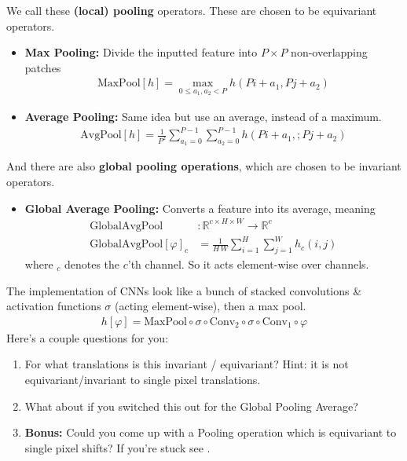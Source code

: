 We call these \textbf{(local) pooling} operators. These are chosen to be equivariant operators.
\begin{itemize}
	\item \textbf{Max Pooling:} Divide the inputted feature into $P \times P$ non-overlapping patches
	\begin{align}
		\text{MaxPool}[h] = \max_{0 \le a_1, a_2 < P} h(Pi + a_1 , Pj + a_2)
	\end{align}
	\item \textbf{Average Pooling:} Same idea but use an average, instead of a maximum.
	\begin{align}
		\text{AvgPool}[h] = \frac{1}{P^2} \sum_{a_1=0}^{P-1} \sum_{a_2=0}^{P-1} h(Pi + a_1, ; Pj + a_2)
	\end{align}
\end{itemize}
And there are also \textbf{global pooling operations}, which are chosen to be invariant operators.
\begin{itemize}
	\item \textbf{Global Average Pooling:} Converts a feature into its average, meaning
	\begin{align}
	\text{GlobalAvgPool} & : \mathbb R^{c \times H \times W} \to \mathbb R^{c}\\
		\text{GlobalAvgPool}[\varphi]_c & = \frac{1}{H \, W}\sum_{i=1}^H \sum_{j=1}^W h_c(i,j)
	\end{align}
	where $_c$ denotes the $c$'th channel. So it acts element-wise over channels.
\end{itemize}
\begin{problem}
	The implementation of CNNs look like a bunch of stacked convolutions \& activation functions $\sigma$ (acting element-wise), then a max pool.
	\begin{align}
		h[\varphi] = \text{MaxPool} \circ \sigma \circ \text{Conv}_2 \circ \sigma \circ \text{Conv}_1 \circ \varphi
	\end{align}
	Here's a couple questions for you:
	\begin{enumerate}
		\item For what translations is this invariant / equivariant? Hint: it is not equivariant/invariant to single pixel translations.
		\item What about if you switched this out for the Global Pooling Average?
		\item \textbf{Bonus:} Could you come up with a Pooling operation which is equivariant to single pixel shifts? If you're stuck see \cite{cnnshiftinvaraintagain}.
	\end{enumerate}
	
\end{problem}
